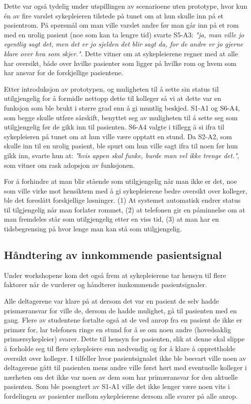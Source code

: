 \noindent
Dette var også tydelig under utspillingen av scenarioene uten prototype, hvor kun én av fire varslet sykepleieren tilstede på tunet om at hun skulle inn på et pasientrom. På spørsmål om man ville varslet andre før man går inn på et rom med en urolig pasient (noe som kan ta lengre tid) svarte S5-A3: \emph{"ja, man ville jo egentlig sagt det, men det er jo sjelden det blir sagt da, for de andre er jo gjerne klare over hva som skjer."}. Dette vitner om at sykepleierene regner med at alle har oversikt, både over hvilke pasienter som ligger på hvilke rom og hvem som har ansvar for de forskjellige pasientene.

\noindent
Etter introduksjon av prototypen, og muligheten til å sette sin status til  utilgjengelig for å formidle nettopp dette til kolleger så vi at dette var en funksjon som ble brukt i større grad enn å gi muntlig beskjed.
S1-A1 og S6-A4, som begge skulle utføre sårskift, benyttet seg av muligheten til å sette seg som utilgjengelig før de gikk inn til pasienten. S6-A4 valgte i tillegg å si ifra til sykepleieren på tunet om at hun ville være opptatt en stund. Da S2-A2, som skulle inn til en urolig pasient, ble spurt om hun ville sagt ifra til noen før hun gikk inn, svarte hun at: \emph{"hvis appen skal funke, burde man vel ikke trenge det."}, som vitner om rask adopsjon av funksjonen.

\noindent
For å forhindre at man blir stående som utilgjengelig når man ikke er det, noe som ville virke mot hensiktem med å gi sykepleierene bedre oversikt over kolleger, ble det foreslått forskjellige løsninger. (1) At systemet automatisk endrer status til tilgjengelig når man forlater rommet, (2) at telefonen gir en påminnelse om at man fremdeles står som utilgjengelig etter en viss tid, (3) at man har en tidsbegrensing på hvor lenge man kan stå som utilgjengelig.


\subsection{Håndtering av innkommende pasientsignal}
Under workshopene kom det også frem at sykepleierene tar hensyn til flere faktorer når de vurderer og håndterer innkommende pasientsignaler. 


\noindent
Alle deltagerene var klare på at dersom det var en pasient de selv hadde prismæransvar for ville de, dersom de hadde mulighet, gå til pasienten med en gang.
Flere av studentene fortalte også at de ved anrop fra en pasient de ikke er primær for, lar telefonen ringe en stund for å se om noen andre (hovedsaklig primærsykepleier) svarer. Dette til hensyn for pasienten, slik at denne skal slippe å forholde seg til flere sykepleiere enn nødvendig og for å klare å opprettholde oversikt over kolleger. I tilfeller hvor pasientsignalet ikke ble besvart ville noen av deltagerene gått til pasienten mens andre ville først hørt med eventuelle kolleger i nærheten om det ikke var noen av dem som har primæransvar for den aktuelle pasienten. Som ble poengtert av S1-A1 ville det ikke lenger være noen vits i fordelingen av pasienter mellom sykepleierene dersom alle svarer på alle anrop.

